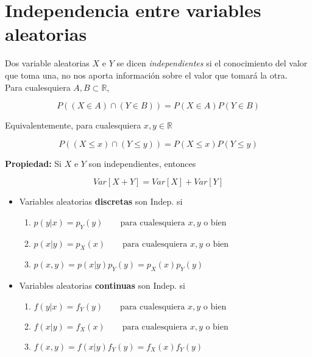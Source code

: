 \section{Independencia entre variables aleatorias}


Dos variable aleatorias $X$ e $Y$ se dicen \textit{independientes} si el conocimiento del valor que toma una, no nos aporta información sobre el valor 
que tomará la otra. \\
Para cualesquiera $A, B \subset \mathbb{R}$,

\[ P((X \in A) \cap (Y \in B)) = P(X \in A)P(Y \in B) \]

Equivalentemente, para cualesquiera $x, y \in \mathbb{R}$

\[ P((X \leq x) \cap (Y \leq y)) = P(X \leq x)P(Y \leq y) \]

\newpage

\textbf{Propiedad:} Si $X$ e $Y$ son independientes, entonces

\[ Var[X + Y] = Var[X] + Var[Y] \]

\begin{itemize}
    \item Variables aleatorias \textbf{discretas} son Indep. si
    \begin{enumerate}
        \item $p(y | x) = p_{Y}(y) \qquad \text{para cualesquiera $x, y$ o bien}$
        \item $p(x | y) = p_{X}(x) \qquad \text{para cualesquiera $x, y$ o bien}$
        \item $p(x, y) = p(x | y)p_{Y}(y) = p_{X}(x)p_{Y}(y) $
    \end{enumerate}
    \item Variables aleatorias \textbf{continuas} son Indep. si
    \begin{enumerate}
        \item $f(y | x) = f_{Y}(y) \qquad \text{para cualesquiera $x, y$ o bien}$
        \item $f(x | y) = f_{X}(x) \qquad \text{para cualesquiera $x, y$ o bien}$
        \item $f(x, y) = f(x | y)f_{Y}(y) = f_{X}(x)f_{Y}(y) $
    \end{enumerate}
\end{itemize}
